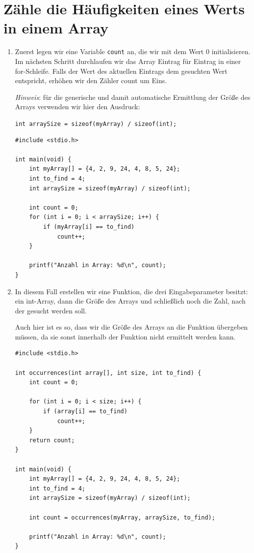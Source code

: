 \chapter{Zähle die Häufigkeiten eines Werts in einem Array}

\begin{enumerate}
\item Zuerst legen wir eine Variable \texttt{count} an, die wir mit dem
Wert 0 initialisieren. Im nächsten Schritt durchlaufen wir das Array Eintrag
für Eintrag in einer for-Schleife. Falls der Wert des aktuellen Eintrags dem
gesuchten Wert entspricht, erhöhen wir den Zähler count um Eins.

\textit{Hinweis}: für die generische und damit automatische Ermittlung der
Größe des Arrays verwenden wir hier den Ausdruck:

\noindent\texttt{int arraySize = sizeof(myArray) / sizeof(int);}

\begin{verbatim}
#include <stdio.h>

int main(void) {
    int myArray[] = {4, 2, 9, 24, 4, 8, 5, 24};
    int to_find = 4;
    int arraySize = sizeof(myArray) / sizeof(int);

    int count = 0;
    for (int i = 0; i < arraySize; i++) {
        if (myArray[i] == to_find)
            count++;
    }

    printf("Anzahl in Array: %d\n", count);
}
\end{verbatim}

\item In diesem Fall erstellen wir eine Funktion, die drei Eingabeparameter
besitzt: ein int-Array, dann die Größe des Arrays und schließlich noch die
Zahl, nach der gesucht werden soll.

Auch hier ist es so, dass wir die Größe des Arrays an die Funktion übergeben
müssen, da sie sonst innerhalb der Funktion nicht ermittelt werden kann.

\begin{verbatim}
#include <stdio.h>

int occurrences(int array[], int size, int to_find) {
    int count = 0;

    for (int i = 0; i < size; i++) {
        if (array[i] == to_find)
            count++;
    }
    return count;
}

int main(void) {
    int myArray[] = {4, 2, 9, 24, 4, 8, 5, 24};
    int to_find = 4;
    int arraySize = sizeof(myArray) / sizeof(int);

    int count = occurrences(myArray, arraySize, to_find);

    printf("Anzahl in Array: %d\n", count);
}
\end{verbatim}

\end{enumerate}



